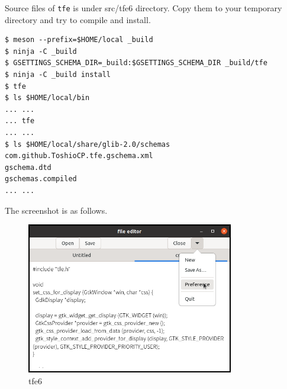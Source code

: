 Source files of \passthrough{\lstinline!tfe!} is under src/tfe6
directory. Copy them to your temporary directory and try to compile and
install.

\begin{lstlisting}
$ meson --prefix=$HOME/local _build
$ ninja -C _build
$ GSETTINGS_SCHEMA_DIR=_build:$GSETTINGS_SCHEMA_DIR _build/tfe
$ ninja -C _build install
$ tfe
$ ls $HOME/local/bin
... ...
... tfe
... ...
$ ls $HOME/local/share/glib-2.0/schemas
com.github.ToshioCP.tfe.gschema.xml
gschema.dtd
gschemas.compiled
... ...
\end{lstlisting}

The screenshot is as follows.

\begin{figure}
\centering
\includegraphics[width=9.06cm,height=6.615cm]{../image/tfe6.png}
\caption{tfe6}
\end{figure}
